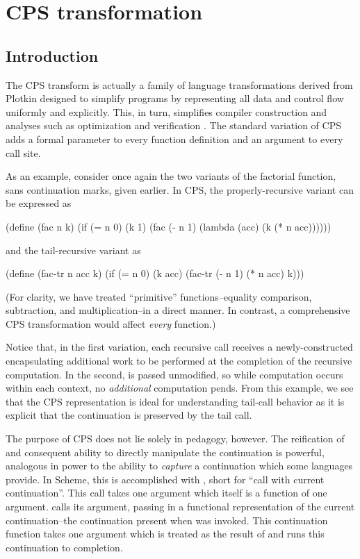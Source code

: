 \chapter{CPS transformation}

\section{Introduction}

The CPS transform is actually a family of language transformations derived from Plotkin
\cite{plotkin1975call} designed to simplify  programs by representing all data and control
flow uniformly and explicitly. This, in turn, simplifies compiler construction and
analyses such as optimization and verification \cite{sabry1994formal}. The standard
variation of CPS adds a formal parameter to every function definition and an argument to
every call site.

As an example, consider once again the two variants of the factorial function, sans
continuation marks, given earlier. In CPS, the properly-recursive variant can be expressed
as
\begin{schemedisplay}
(define (fac n k) 
  (if (= n 0)
      (k 1)
      (fac (- n 1) (lambda (acc) (k (* n acc))))))
\end{schemedisplay}
and the tail-recursive variant as
\begin{schemedisplay}
(define (fac-tr n acc k)
  (if (= n 0)
      (k acc)
      (fac-tr (- n 1) (* n acc) k)))
\end{schemedisplay}
(For clarity, we have treated ``primitive'' functions--equality comparison, subtraction,
and multiplication--in a direct manner. In contrast, a comprehensive CPS transformation
would affect \emph{every} function.)

Notice that, in the first variation, each recursive call receives a newly-constructed
 encapsulating additional work to be performed at the completion of the
recursive computation. In the second,  is passed unmodified, so while
computation occurs within each context, no \emph{additional} computation pends. From this
example, we see that the CPS representation is ideal for understanding tail-call behavior
as it is explicit that the continuation is preserved by the tail call.

The purpose of CPS does not lie solely in pedagogy, however. The reification of and
consequent ability to directly manipulate the continuation is powerful, analogous in power
to the ability to \emph{capture} a continuation which some languages provide. In Scheme,
this is accomplished with , short for ``call with current continuation''.
This call takes one argument which itself is a function of one argument. 
calls its argument, passing in a functional representation of the current
continuation--the continuation present when  was invoked. This
continuation function takes one argument which is treated as the result of
 and runs this continuation to completion.

